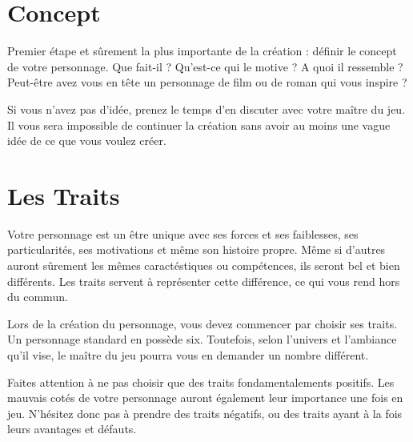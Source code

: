 \documentclass{conf/FusinaClass}
\begin{document}
\chapter{Concept}
Premier étape et sûrement la plus importante de la création : définir le concept de votre personnage. Que fait-il ? Qu'est-ce qui le motive ? A quoi il ressemble ? Peut-être avez vous en tête un personnage de film ou de roman qui vous inspire ? 

Si vous n'avez pas d'idée, prenez le temps d'en discuter avec votre maître du jeu. Il vous sera impossible de continuer la création sans avoir au moins une vague idée de ce que vous voulez créer.

\chapter{Les Traits}
Votre personnage est un être unique avec ses forces et ses faiblesses, ses particularités, ses motivations et même son histoire propre. Même si d'autres auront sûrement les mêmes caractéstiques ou compétences, ils seront bel et bien différents. Les traits servent à représenter cette différence, ce qui vous rend hors du commun.

Lors de la création du personnage, vous devez commencer par choisir ses traits. Un personnage standard en possède six. Toutefois, selon l'univers et l'ambiance qu'il vise, le maître du jeu pourra vous en demander un nombre différent.


Faites attention à ne pas choisir que des traits fondamentalements positifs. Les mauvais cotés de votre personnage auront également leur importance une fois en jeu. N'hésitez donc pas à prendre des traits négatifs, ou des traits ayant à la fois leurs avantages et défauts.
\end{document}
